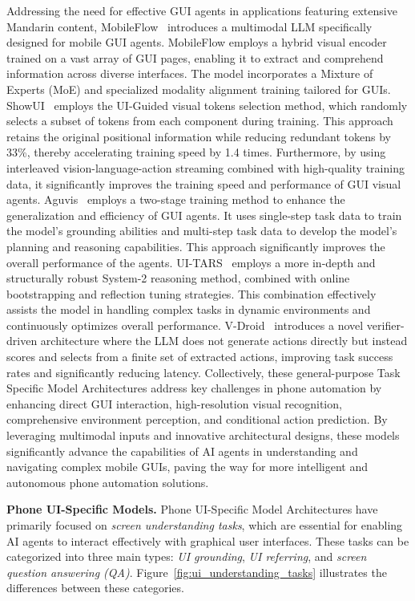 Addressing the need for effective GUI agents in applications featuring extensive Mandarin content, MobileFlow~\cite{nong2024mobileflow} introduces a multimodal LLM specifically designed for mobile GUI agents. MobileFlow employs a hybrid visual encoder trained on a vast array of GUI pages, enabling it to extract and comprehend information across diverse interfaces. The model incorporates a Mixture of Experts (MoE) and specialized modality alignment training tailored for GUIs.
ShowUI~\cite{lin2024showui} employs the UI-Guided visual tokens selection method, which randomly selects a subset of tokens from each component during training. This approach retains the original positional information while reducing redundant tokens by 33\%, thereby accelerating training speed by 1.4 times. Furthermore, by using interleaved vision-language-action streaming combined with high-quality training data, it significantly improves the training speed and performance of GUI visual agents. Aguvis~\cite{xu2024aguvis} employs a two-stage training method to enhance the generalization and efficiency of GUI agents. It uses single-step task data to train the model's grounding abilities and multi-step task data to develop the model's planning and reasoning capabilities. This approach significantly improves the overall performance of the agents.
UI-TARS~\cite{qin2025ui} employs a more in-depth and structurally robust System-2 reasoning method, combined with online bootstrapping and reflection tuning strategies. This combination effectively assists the model in handling complex tasks in dynamic environments and continuously optimizes overall performance.
V-Droid~\cite{dai2025advancing} introduces a novel verifier-driven architecture where the LLM does not generate actions directly but instead scores and selects from a finite set of extracted actions, improving task success rates and significantly reducing latency.
Collectively, these general-purpose Task Specific Model Architectures address key challenges in phone automation by enhancing direct GUI interaction, high-resolution visual recognition, comprehensive environment perception, and conditional action prediction. By leveraging multimodal inputs and innovative architectural designs, these models significantly advance the capabilities of AI agents in understanding and navigating complex mobile GUIs, paving the way for more intelligent and autonomous phone automation solutions.


\noindent\textbf{Phone UI-Specific Models.}
Phone UI-Specific Model Architectures have primarily focused on \textit{screen understanding tasks}, which are essential for enabling AI agents to interact effectively with graphical user interfaces. These tasks can be categorized into three main types: \textit{UI grounding}, \textit{UI referring}, and \textit{screen question answering (QA)}. Figure~\ref{fig:ui_understanding_tasks} illustrates the differences between these categories.

